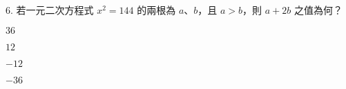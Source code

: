 \documentclass[12pt]{article}
\begin{document}
\begin{problem}
  \item[6.] 若一元二次方程式 $x^2 = 144$ 的兩根為 $a$、$b$，且 $a > b$，則 $a + 2b$ 之值為何？
  \begin{choices}
    \item $36$
    \item $12$
    \item $-12$
    \item $-36$
  \end{choices}
\end{problem}
\end{document}
